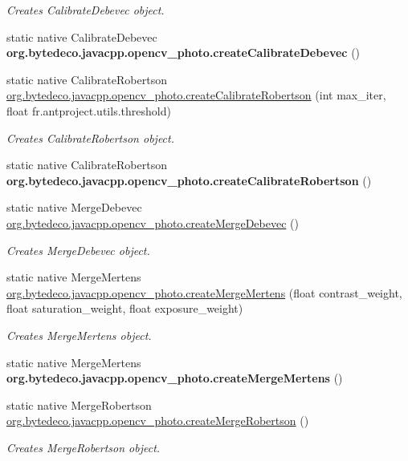\begin{DoxyCompactItemize}
\begin{DoxyCompactList}\small\item\em Creates Calibrate\+Debevec object. \end{DoxyCompactList}\item 
\mbox{\label{group__photo__hdr_ga3b370075247e9bd2f724b316ad9970f3}} 
static native Calibrate\+Debevec {\bfseries org.\+bytedeco.\+javacpp.\+opencv\+\_\+photo.\+create\+Calibrate\+Debevec} ()
\item 
static native Calibrate\+Robertson \hyperlink{group__photo__hdr_ga1ac32f0f1042b3436bd7daf88bb48760}{org.\+bytedeco.\+javacpp.\+opencv\+\_\+photo.\+create\+Calibrate\+Robertson} (int max\+\_\+iter, float fr.antproject.utils.threshold)
\begin{DoxyCompactList}\small\item\em Creates Calibrate\+Robertson object. \end{DoxyCompactList}\item 
\mbox{\label{group__photo__hdr_ga3032d7fe6e15a35aa4722340e887ca17}} 
static native Calibrate\+Robertson {\bfseries org.\+bytedeco.\+javacpp.\+opencv\+\_\+photo.\+create\+Calibrate\+Robertson} ()
\item 
\mbox{\label{group__photo__hdr_ga90dac3606f6344e591968df25cd8ace6}} 
static native Merge\+Debevec \hyperlink{group__photo__hdr_ga90dac3606f6344e591968df25cd8ace6}{org.\+bytedeco.\+javacpp.\+opencv\+\_\+photo.\+create\+Merge\+Debevec} ()
\begin{DoxyCompactList}\small\item\em Creates Merge\+Debevec object. \end{DoxyCompactList}\item 
static native Merge\+Mertens \hyperlink{group__photo__hdr_ga7f47cc9c6b5e72f9fbf7281271dfc426}{org.\+bytedeco.\+javacpp.\+opencv\+\_\+photo.\+create\+Merge\+Mertens} (float contrast\+\_\+weight, float saturation\+\_\+weight, float exposure\+\_\+weight)
\begin{DoxyCompactList}\small\item\em Creates Merge\+Mertens object. \end{DoxyCompactList}\item 
\mbox{\label{group__photo__hdr_ga30b2c33f0028b54182b84964d6258390}} 
static native Merge\+Mertens {\bfseries org.\+bytedeco.\+javacpp.\+opencv\+\_\+photo.\+create\+Merge\+Mertens} ()
\item 
\mbox{\label{group__photo__hdr_ga658fdc1c45f60d70951e9364b7a974ae}} 
static native Merge\+Robertson \hyperlink{group__photo__hdr_ga658fdc1c45f60d70951e9364b7a974ae}{org.\+bytedeco.\+javacpp.\+opencv\+\_\+photo.\+create\+Merge\+Robertson} ()
\begin{DoxyCompactList}\small\item\em Creates Merge\+Robertson object. \end{DoxyCompactList}\end{DoxyCompactItemize}
